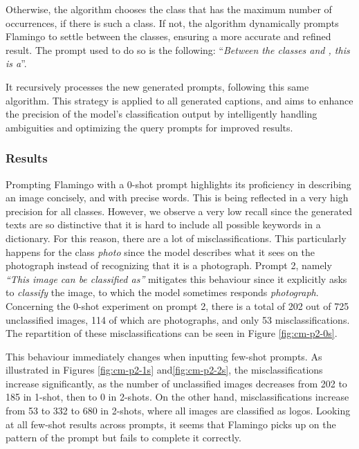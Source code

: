 Otherwise, the algorithm chooses the class that has the maximum number of occurrences, if there is such a class. If not, the algorithm dynamically prompts Flamingo to settle between the classes, ensuring a more accurate and refined result. The prompt used to do so is the following: 
 “\textit{Between the classes \blank{} and \blank{}, this is a}”.
 
It recursively processes the new generated prompts, following this same algorithm. This strategy is applied to all generated captions, and aims to enhance the precision of the model's classification output by intelligently handling ambiguities and optimizing the query prompts for improved results.



\subsubsection{Results}
Prompting Flamingo with a 0-shot prompt highlights its proficiency in describing an image concisely, and with precise words. This is being reflected in a very high precision for all classes. However, we observe a very low recall since the generated texts are so distinctive that it is hard to include all possible keywords in a dictionary. For this reason, there are a lot of misclassifications. This particularly happens for the class \textit{photo} since the model describes what it sees on the photograph instead of recognizing that it is a photograph. Prompt 2, namely \textit{“This image can be classified as”} mitigates this behaviour since it explicitly asks to \textit{classify} the image, to which the model sometimes responds \textit{photograph}. Concerning the 0-shot experiment on prompt 2, there is a total of 202 out of 725 unclassified images, 114 of which are photographs, and only 53 misclassifications. The repartition of these misclassifications can be seen in Figure \ref{fig:cm-p2-0s}. 

This behaviour immediately changes when inputting few-shot prompts. As illustrated in Figures \ref{fig:cm-p2-1s} and\ref{fig:cm-p2-2s}, the misclassifications increase significantly, as the number of unclassified images decreases from 202 to 185 in 1-shot, then to 0 in 2-shots. On the other hand, misclassifications increase from 53 to 332 to 680 in 2-shots, where all images are classified as logos. Looking at all few-shot results across prompts, it seems that Flamingo picks up on the pattern of the prompt but fails to complete it correctly.

